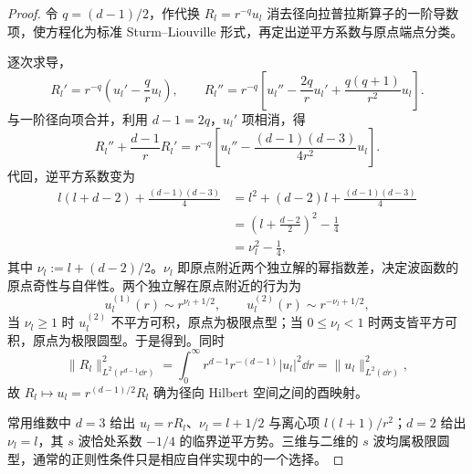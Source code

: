 \begin{proof}
 令 \(q=(d-1)/2\)，作代换 \(R_l=r^{-q}u_l\) 消去径向拉普拉斯算子的一阶导数项，使方程化为标准 Sturm--Liouville 形式，再定出逆平方系数与原点端点分类。

 逐次求导，
 \begin{equation*}
  R_l'=r^{-q}\left(u_l'-\frac qru_l\right),
  \qquad
  R_l''=r^{-q}\left[
   u_l''-\frac{2q}{r}u_l'
   +\frac{q(q+1)}{r^2}u_l\right].
 \end{equation*}
 与一阶径向项合并，利用 $d-1=2q$，$u_l'$ 项相消，得
 \begin{equation*}
  R_l''+\frac{d-1}{r}R_l'
  =r^{-q}\left[
   u_l''-\frac{(d-1)(d-3)}{4r^2}u_l
  \right].
 \end{equation*}
 代回，逆平方系数变为
 \begin{equation*}
  \begin{aligned}
  l(l+d-2)+\frac{(d-1)(d-3)}4
  &=l^2+(d-2)l+\frac{(d-1)(d-3)}4\\
  &=\left(l+\frac{d-2}{2}\right)^2-\frac14\\
  &=\nu_l^2-\frac14,
  \end{aligned}
 \end{equation*}
 其中 \(\nu_l:=l+(d-2)/2\)。\(\nu_l\) 即原点附近两个独立解的幂指数差，决定波函数的原点奇性与自伴性。两个独立解在原点附近的行为为
 \begin{equation*}
   u_l^{(1)}(r)\sim r^{\nu_l+1/2},\qquad
   u_l^{(2)}(r)\sim r^{-\nu_l+1/2},
 \end{equation*}
 当 \(\nu_l\ge1\) 时 \(u_l^{(2)}\) 不平方可积，原点为极限点型；当 \(0\le\nu_l<1\) 时两支皆平方可积，原点为极限圆型。于是得到。同时
 \begin{equation*}
  \|R_l\|_{L^2(r^{d-1}\dd r)}^2
  =\int_0^\infty r^{d-1}r^{-(d-1)}|u_l|^2\dd r
  =\|u_l\|_{L^2(\dd r)}^2,
 \end{equation*}
 故 $R_l\mapsto u_l=r^{(d-1)/2}R_l$ 确为径向 Hilbert 空间之间的酉映射。

 常用维数中 \(d=3\) 给出 \(u_l=rR_l\)、\(\nu_l=l+1/2\) 与离心项 \(l(l+1)/r^2\)；\(d=2\) 给出 \(\nu_l=l\)，其 \(s\) 波恰处系数 \(-1/4\) 的临界逆平方势。三维与二维的 \(s\) 波均属极限圆型，通常的正则性条件只是相应自伴实现中的一个选择。
 \end{proof}

